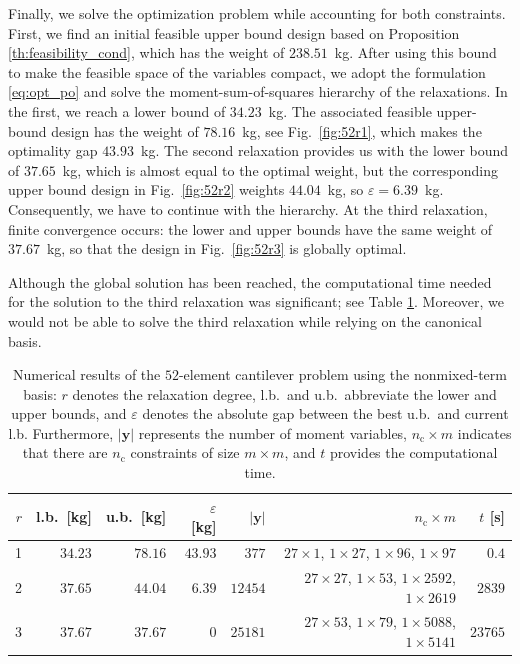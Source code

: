 \documentclass[final,onefignum,onetabnum]{siamart220329}
\begin{document}
Finally, we solve the optimization problem while accounting for both constraints. First, we find an initial feasible upper bound design based on Proposition \ref{th:feasibility_cond}, which has the weight of $238.51$~kg. After using this bound to make the feasible space of the variables compact, we adopt the formulation \eqref{eq:opt_po} and solve the moment-sum-of-squares hierarchy of the relaxations. In the first, we reach a lower bound of $34.23$~kg. The associated feasible upper-bound design has the weight of $78.16$~kg, see Fig.~\ref{fig:52r1}, which makes the optimality gap $43.93$~kg. The second relaxation provides us with the lower bound of $37.65$~kg, which is almost equal to the optimal weight, but the corresponding upper bound design in Fig.~\ref{fig:52r2} weights $44.04$~kg, so $\varepsilon=6.39$~kg. Consequently, we have to continue with the hierarchy. At the third relaxation, finite convergence occurs: the lower and upper bounds have the same weight of $37.67$~kg, so that the design in Fig.~\ref{fig:52r3} is globally optimal.

Although the global solution has been reached, the computational time needed for the solution to the third relaxation was significant; see Table \ref{tab:52nmt}. Moreover, we would not be able to solve the third relaxation while relying on the canonical basis.

\begin{table}[!htbp]
    \centering
    \setlength{\tabcolsep}{5pt}
    \begin{tabular}{rrrrrrr}
         $r$ & l.b.\ [kg] & u.b.\ [kg] & $\varepsilon$ [kg] & $\lvert \mathbf{y}\rvert$ & $n_\mathrm{c} \times m$  & $t$ [s]\\ \hline
         1 & $34.23$ & $78.16$ & $43.93$ & $377$ & $27\times1$, $1\times27$, $1\times96$, $1\times97$ & $0.4$\\
         2 & $37.65$ & $44.04$ & $6.39$ & $12454$ & $27\times27$, $1\times53$, $1\times2592$, $1\times2619$ & $2839$\\
         3 & $37.67$ & $37.67$ & $0$ & $25181$ & $27\times53$, $1\times79$, $1\times5088$, $1\times5141$ & $23765$
    \end{tabular}
    \caption{Numerical results of the $52$-element cantilever problem using the nonmixed-term basis: $r$ denotes the relaxation degree, l.b.\ and u.b.\ abbreviate the lower and upper bounds, and $\varepsilon$ denotes the absolute gap between the best u.b.\ and current l.b. Furthermore, $\lvert\mathbf{y}\rvert$ represents the number of moment variables, $n_\mathrm{c}\times m$ indicates that there are $n_\mathrm{c}$ constraints of size $m\times m$, and $t$ provides the computational time.}
    \label{tab:52nmt}
\end{table}
\end{document}
